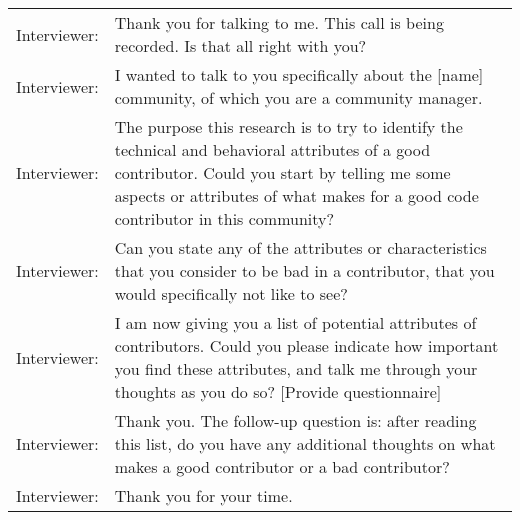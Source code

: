 \begin{tabular}{p{3cm}p{12cm}}
Interviewer: 	&	Thank you for talking to me. This call is being recorded. Is that all right with you?\\
Interviewer:	&	I wanted to talk to you specifically about the [name] community, of which you are a community manager.\\
Interviewer:	&	The purpose this research is to try to identify the technical and behavioral attributes of a good contributor. Could you start by telling me some aspects or attributes of what makes for a good code contributor in this community?\\
Interviewer:	&	Can you state any of the attributes or characteristics that you consider to be bad in a contributor, that you would specifically not like to see?\\
Interviewer:	&	I am now giving you a list of potential attributes of contributors. Could you please indicate how important you find these attributes, and talk me through your thoughts as you do so?
[Provide questionnaire]\\

Interviewer:	&	Thank you. The follow-up question is: after reading this list, do you have any additional thoughts on what makes a good contributor or a bad contributor?\\
Interviewer:	&	Thank you for your time.\\
\end{tabular}

